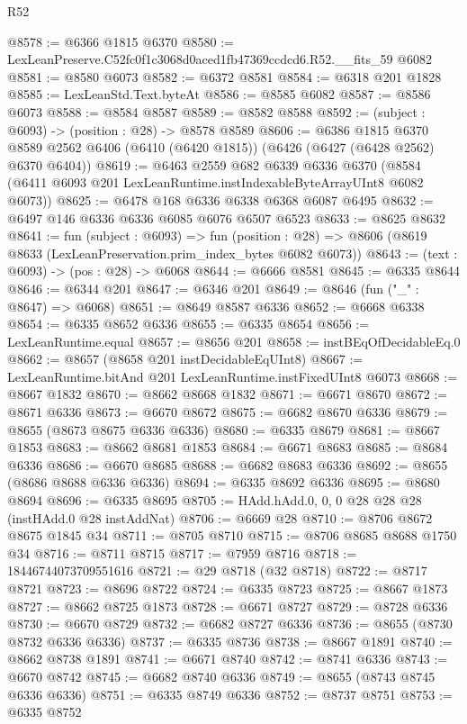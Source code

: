 \begin{lexlean}{R52}
\begin{coremodule}
@8578 := @6366 @1815 @6370
@8580 := LexLeanPreserve.C52fc0f1c3068d0aced1fb47369ccdcd6.R52.__fits_59 @6082
@8581 := @8580 @6073
@8582 := @6372 @8581
@8584 := @6318 @201 @1828
@8585 := LexLeanStd.Text.byteAt
@8586 := @8585 @6082
@8587 := @8586 @6073
@8588 := @8584 @8587
@8589 := @8582 @8588
@8592 := (subject : @6093) -> (position : @28) -> @8578 @8589
@8606 := @6386
    @1815
    @6370
    @8589
    @2562
    @6406
    (@6410 (@6420 @1815))
    (@6426 (@6427 (@6428 @2562) @6370 @6404))
@8619 := @6463
    @2559
    @682
    @6339
    @6336
    @6370
    (@8584 (@6411 @6093 @201 LexLeanRuntime.instIndexableByteArrayUInt8 @6082 @6073))
@8625 := @6478 @168 @6336 @6338 @6368 @6087 @6495
@8632 := @6497 @146 @6336 @6336 @6085 @6076 @6507 @6523
@8633 := @8625 @8632
@8641 := fun (subject : @6093) =>
  fun (position : @28) => @8606 (@8619 @8633 (LexLeanPreservation.prim_index_bytes @6082 @6073))
@8643 := (text : @6093) -> (pos : @28) -> @6068
@8644 := @6666 @8581
@8645 := @6335 @8644
@8646 := @6344 @201
@8647 := @6346 @201
@8649 := @8646 (fun ("_" : @8647) => @6068)
@8651 := @8649 @8587 @6336
@8652 := @6668 @6338
@8654 := @6335 @8652 @6336
@8655 := @6335 @8654
@8656 := LexLeanRuntime.equal
@8657 := @8656 @201
@8658 := instBEqOfDecidableEq.{0}
@8662 := @8657 (@8658 @201 instDecidableEqUInt8)
@8667 := LexLeanRuntime.bitAnd @201 LexLeanRuntime.instFixedUInt8 @6073
@8668 := @8667 @1832
@8670 := @8662 @8668 @1832
@8671 := @6671 @8670
@8672 := @8671 @6336
@8673 := @6670 @8672
@8675 := @6682 @8670 @6336
@8679 := @8655 (@8673 @8675 @6336 @6336)
@8680 := @6335 @8679
@8681 := @8667 @1853
@8683 := @8662 @8681 @1853
@8684 := @6671 @8683
@8685 := @8684 @6336
@8686 := @6670 @8685
@8688 := @6682 @8683 @6336
@8692 := @8655 (@8686 @8688 @6336 @6336)
@8694 := @6335 @8692 @6336
@8695 := @8680 @8694
@8696 := @6335 @8695
@8705 := HAdd.hAdd.{0, 0, 0} @28 @28 @28 (instHAdd.{0} @28 instAddNat)
@8706 := @6669 @28
@8710 := @8706 @8672 @8675 @1845 @34
@8711 := @8705 @8710
@8715 := @8706 @8685 @8688 @1750 @34
@8716 := @8711 @8715
@8717 := @7959 @8716
@8718 := 18446744073709551616
@8721 := @29 @8718 (@32 @8718)
@8722 := @8717 @8721
@8723 := @8696 @8722
@8724 := @6335 @8723
@8725 := @8667 @1873
@8727 := @8662 @8725 @1873
@8728 := @6671 @8727
@8729 := @8728 @6336
@8730 := @6670 @8729
@8732 := @6682 @8727 @6336
@8736 := @8655 (@8730 @8732 @6336 @6336)
@8737 := @6335 @8736
@8738 := @8667 @1891
@8740 := @8662 @8738 @1891
@8741 := @6671 @8740
@8742 := @8741 @6336
@8743 := @6670 @8742
@8745 := @6682 @8740 @6336
@8749 := @8655 (@8743 @8745 @6336 @6336)
@8751 := @6335 @8749 @6336
@8752 := @8737 @8751
@8753 := @6335 @8752

\end{coremodule}
\end{lexlean}
